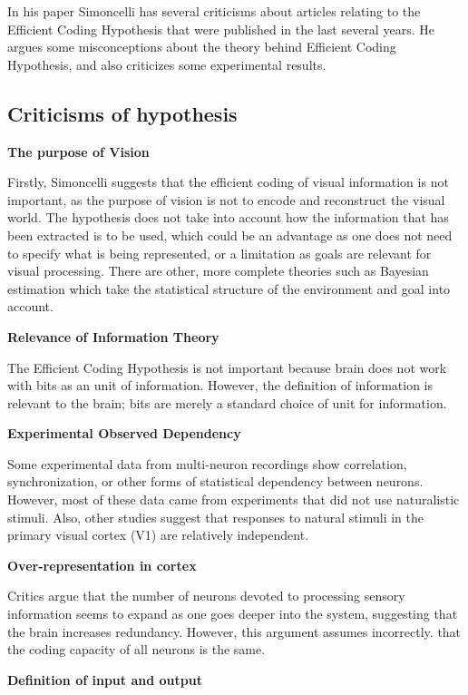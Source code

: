 \documentclass[twoside]{article}
\begin{document}
\begin{multicols}{2}
In his paper Simoncelli has several criticisms about articles relating to the Efficient Coding Hypothesis that were published in the last several years. He argues some misconceptions about the theory behind Efficient Coding Hypothesis, and also criticizes some experimental results.

\subsection{Criticisms of hypothesis}

\noindent\textbf{The purpose of Vision}

Firstly, Simoncelli suggests that the efficient coding of visual information is not important, as the purpose of vision is not to encode and reconstruct the visual world. The hypothesis does not take into account how the information that has been extracted is to be used, which could be an advantage as one does not need to specify what is being represented, or a limitation as goals are relevant for visual processing. There are other, more complete theories such as Bayesian estimation which take the statistical structure of the environment and goal into account.

\noindent\textbf{Relevance of Information Theory}

The Efficient Coding Hypothesis is not important because brain does not work with bits as an unit of information. However, the definition of information is relevant to the brain; bits are merely a standard choice of unit for information.

\noindent\textbf{Experimental Observed Dependency}

Some experimental data from multi-neuron recordings show correlation, synchronization, or other forms of statistical dependency between neurons. However, most of these data came from experiments that did not use naturalistic stimuli. Also, other studies suggest that responses to natural stimuli in the primary visual cortex (V1) are relatively independent. 

\noindent\textbf{Over-representation in cortex}

Critics argue that the number of neurons devoted to processing sensory information seems to expand as one goes deeper into the system, suggesting that the brain increases redundancy. However, this argument assumes incorrectly. that the coding capacity of all neurons is the same. 

\noindent\textbf{Definition of input and output}


\end{multicols}
\end{document}
